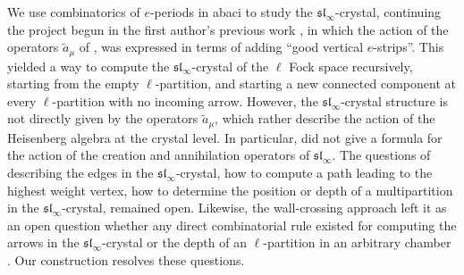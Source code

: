 \documentclass[12pt]{amsart}
\numberwithin{equation}{section}
\theoremstyle{definition}
\newcommand{\slinf}{\mathfrak{sl}_\infty}
\begin{document}
We use combinatorics of $e$-periods in abaci to study the $\slinf$-crystal, continuing the project begun in the first author's previous work \cite[Section 5]{Gerber2016a},
in which the action of the operators $\tilde{a}_\mu$ of \cite{ShanVasserot2012},\cite{Losev2015} was expressed in terms of adding ``good vertical $e$-strips''.
This yielded a way to compute the $\slinf$-crystal of the $\ell$ Fock space recursively, starting from the empty $\ell$-partition, 
and starting a new connected component at every $\ell$-partition with no incoming arrow.
However, the $\slinf$-crystal structure is not directly given by the operators $\tilde{a}_\mu$, which rather describe the action of the Heisenberg algebra at the crystal level. 
In particular, \cite{Gerber2016a} did not give a formula for the action of the creation and annihilation operators of $\slinf$. 
The questions of describing the edges in the $\slinf$-crystal, how to compute a path leading to the highest weight vertex, how to determine the position or depth of a multipartition in the $\slinf$-crystal, remained open. 
Likewise, the wall-crossing approach left it as an open question whether any direct combinatorial rule existed for computing the arrows in the $\slinf$-crystal or the depth of an $\ell$-partition in an arbitrary chamber \cite[Section 1.2]{Losev2015}. Our construction resolves these questions.
\end{document}
